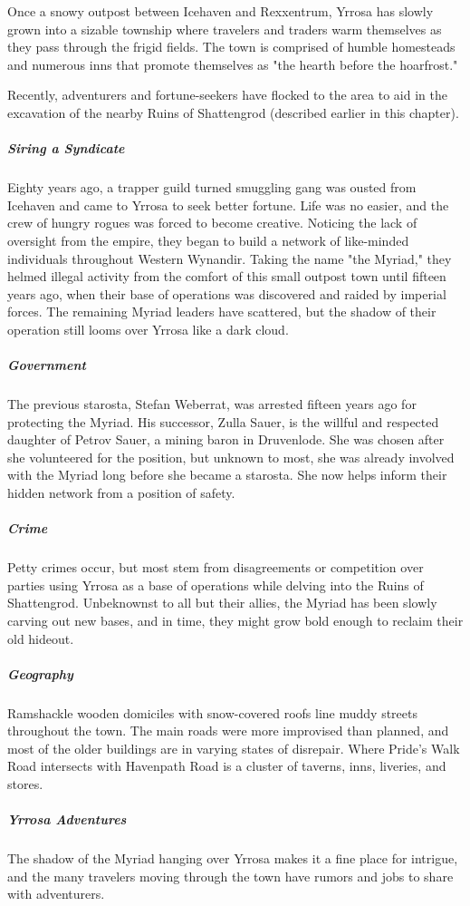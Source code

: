 \documentclass[10pt,a4paper,twoside,bg=print,twocolumn,openany,nodeprecatedcode]{dndbook}
\begin{document}
Once a snowy outpost between Icehaven and Rexxentrum, Yrrosa has slowly grown into a sizable township where travelers and traders warm themselves as they pass through the frigid fields. The town is comprised of humble homesteads and numerous inns that promote themselves as "the hearth before the hoarfrost."

Recently, adventurers and fortune-seekers have flocked to the area to aid in the excavation of the nearby Ruins of Shattengrod (described earlier in this chapter).

\subparagraph{Siring a Syndicate}
Eighty years ago, a trapper guild turned smuggling gang was ousted from Icehaven and came to Yrrosa to seek better fortune. Life was no easier, and the crew of hungry rogues was forced to become creative. Noticing the lack of oversight from the empire, they began to build a network of like-minded individuals throughout Western Wynandir. Taking the name "the Myriad," they helmed illegal activity from the comfort of this small outpost town until fifteen years ago, when their base of operations was discovered and raided by imperial forces. The remaining Myriad leaders have scattered, but the shadow of their operation still looms over Yrrosa like a dark cloud.

\subparagraph{Government}
The previous starosta, Stefan Weberrat, was arrested fifteen years ago for protecting the Myriad. His successor, Zulla Sauer, is the willful and respected daughter of Petrov Sauer, a mining baron in Druvenlode. She was chosen after she volunteered for the position, but unknown to most, she was already involved with the Myriad long before she became a starosta. She now helps inform their hidden network from a position of safety.

\subparagraph{Crime}
Petty crimes occur, but most stem from disagreements or competition over parties using Yrrosa as a base of operations while delving into the Ruins of Shattengrod. Unbeknownst to all but their allies, the Myriad has been slowly carving out new bases, and in time, they might grow bold enough to reclaim their old hideout.

\subparagraph{Geography}
Ramshackle wooden domiciles with snow-covered roofs line muddy streets throughout the town. The main roads were more improvised than planned, and most of the older buildings are in varying states of disrepair. Where Pride's Walk Road intersects with Havenpath Road is a cluster of taverns, inns, liveries, and stores.

\subparagraph{Yrrosa Adventures}
The shadow of the Myriad hanging over Yrrosa makes it a fine place for intrigue, and the many travelers moving through the town have rumors and jobs to share with adventurers.
\end{document}
